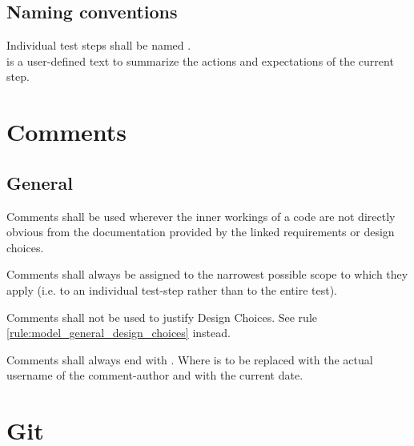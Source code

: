 \documentclass[draft]{efsguide}
\begin{document}
\section{Naming conventions}
\label{rules:tests_naming}
\begin{rules}
\item Individual test steps shall be named .\\  is a user-defined text to summarize the actions and expectations of the current step. 
\end{rules}


\chapter{Comments}
\section{General}
\begin{rules}
\item \label{rule:comments_inner_workings} Comments shall be used wherever the inner workings of a code are not directly obvious from the documentation provided by the linked requirements or design choices. 
\item Comments shall always be assigned to the narrowest possible scope to which they apply (i.e. to an individual test-step rather than to the entire test). 
\item Comments shall not be used to justify Design Choices. See rule \ref{rule:model_general_design_choices} instead. 
\item {} Comments shall always end with . Where  is to be replaced with the actual username of the comment-author and  with the current date. 
\end{rules}


\chapter{Git}
\end{document}
